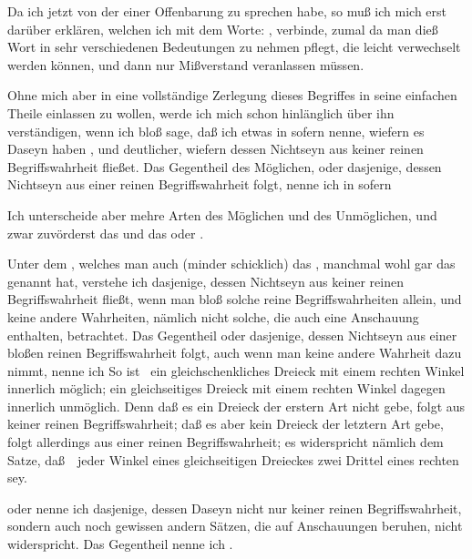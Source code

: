 Da ich jetzt von der  einer Offenbarung zu sprechen habe, so muß ich mich erst darüber erklären, welchen  ich mit dem Worte: , verbinde, zumal da man dieß Wort in sehr verschiedenen Bedeutungen zu nehmen pflegt, die leicht verwechselt werden können, und dann nur Mißverstand veranlassen müssen.
\begin{aufza}
\item Ohne mich aber in eine vollständige Zerlegung dieses Begriffes in seine einfachen Theile einlassen zu wollen, werde ich mich schon hinlänglich über ihn verständigen, wenn ich bloß sage, daß ich etwas in sofern  nenne, wiefern es Daseyn haben , und deutlicher, wiefern dessen Nichtseyn aus keiner reinen Begriffswahrheit fließet. Das Gegentheil des Möglichen, oder dasjenige, dessen Nichtseyn aus einer reinen Begriffswahrheit folgt, nenne ich in sofern 
\item Ich unterscheide aber mehre Arten des Möglichen und des Unmöglichen, und zwar zuvörderst das  und das  oder .
\begin{aufzb}
\item Unter dem , welches man auch (minder schicklich) das , manchmal wohl gar das  genannt hat, verstehe ich dasjenige, dessen Nichtseyn aus keiner reinen Begriffswahrheit fließt, wenn man bloß solche reine Begriffswahrheiten allein, und keine andere Wahrheiten, nämlich nicht solche, die auch eine Anschauung enthalten, betrachtet. Das Gegentheil oder dasjenige, dessen Nichtseyn aus einer bloßen reinen Begriffswahrheit folgt, auch wenn man keine andere Wahrheit dazu nimmt, nenne ich  So ist \zB\ ein gleichschenkliches Dreieck mit einem rechten Winkel innerlich möglich; ein gleichseitiges Dreieck mit einem rechten Winkel dagegen innerlich unmöglich. Denn daß es ein Dreieck der erstern Art nicht gebe, folgt aus keiner reinen Begriffswahrheit; daß es aber kein Dreieck der letztern Art gebe, folgt allerdings aus einer reinen Begriffswahrheit; es widerspricht nämlich dem Satze, daß~\ jeder Winkel eines gleichseitigen Dreieckes zwei Drittel eines rechten sey.
\item {} oder  nenne ich dasjenige, dessen Daseyn nicht nur keiner reinen Begriffswahrheit, sondern auch noch gewissen andern Sätzen, die auf Anschauungen beruhen, nicht widerspricht. Das Gegentheil nenne ich .

\end{aufzb}
\end{aufza}
